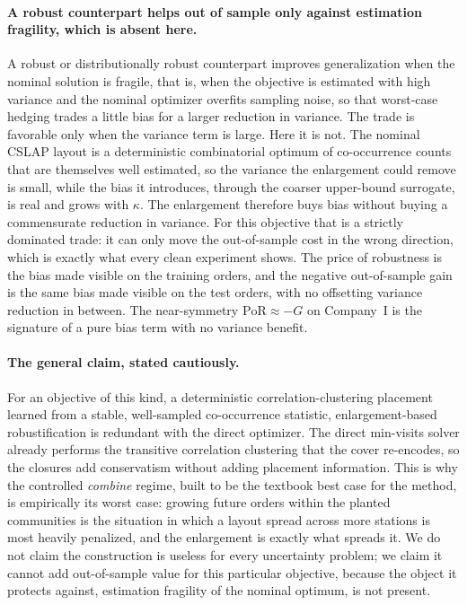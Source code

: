 \documentclass[preprint,review,11pt,authoryear]{elsarticle}
\begin{document}
\paragraph{A robust counterpart helps out of sample only against estimation fragility, which is absent here.}
A robust or distributionally robust counterpart improves generalization when the nominal solution is fragile, that is, when the objective is estimated with high variance and the nominal optimizer overfits sampling noise, so that worst-case hedging trades a little bias for a larger reduction in variance. The trade is favorable only when the variance term is large. Here it is not. The nominal CSLAP layout is a deterministic combinatorial optimum of co-occurrence counts that are themselves well estimated, so the variance the enlargement could remove is small, while the bias it introduces, through the coarser upper-bound surrogate, is real and grows with $\kappa$. The enlargement therefore buys bias without buying a commensurate reduction in variance. For this objective that is a strictly dominated trade: it can only move the out-of-sample cost in the wrong direction, which is exactly what every clean experiment shows. The price of robustness is the bias made visible on the training orders, and the negative out-of-sample gain is the same bias made visible on the test orders, with no offsetting variance reduction in between. The near-symmetry $\mathrm{PoR} \approx -G$ on Company~I is the signature of a pure bias term with no variance benefit.

\paragraph{The general claim, stated cautiously.}
For an objective of this kind, a deterministic correlation-clustering placement learned from a stable, well-sampled co-occurrence statistic, enlargement-based robustification is redundant with the direct optimizer. The direct min-visits solver already performs the transitive correlation clustering that the cover re-encodes, so the closures add conservatism without adding placement information. This is why the controlled \emph{combine} regime, built to be the textbook best case for the method, is empirically its worst case: growing future orders within the planted communities is the situation in which a layout spread across more stations is most heavily penalized, and the enlargement is exactly what spreads it. We do not claim the construction is useless for every uncertainty problem; we claim it cannot add out-of-sample value for this particular objective, because the object it protects against, estimation fragility of the nominal optimum, is not present.
\end{document}
